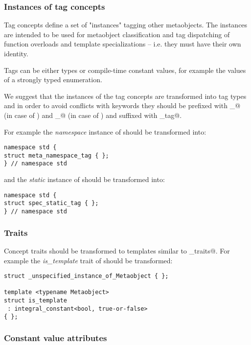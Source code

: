 \subsubsection{Instances of tag concepts}

Tag concepts define a set of "instances" tagging other metaobjects.
The instances are intended to be used for metaobject classification and
tag dispatching of function overloads and template specializations --
i.e. they must have their own identity.

Tags can be either types or compile-time constant values, for example
the values of a strongly typed enumeration.

We suggest that the instances of the tag concepts are transformed
into tag types and in order to avoid conflicts with keywords
they should be prefixed with \verb@meta_@ (in case of {})
and \verb@spec_@ (in case of {}) and suffixed with
\verb@_tag@.

For example the {\em namespace} instance of {}
should be transformed into:
\begin{verbatim}
namespace std {
struct meta_namespace_tag { };
} // namespace std
\end{verbatim}
and the {\em static} instance of {} should be
transformed into:
\begin{verbatim}
namespace std {
struct spec_static_tag { };
} // namespace std
\end{verbatim}

\subsubsection{Traits}

Concept traits should be transformed to templates similar to \verb@type_traits@.
For example the {\em is\_template} trait of {}
should be transformed:
\begin{verbatim}
struct _unspecified_instance_of_Metaobject { };

template <typename Metaobject>
struct is_template
 : integral_constant<bool, true-or-false>
{ };
\end{verbatim}

\subsubsection{Constant value attributes}

